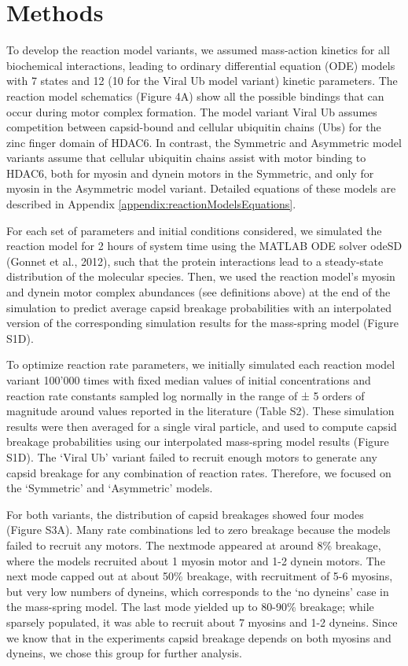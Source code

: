 \section{Methods}

To develop the reaction model variants, we assumed mass-action kinetics for all biochemical interactions, leading to ordinary differential equation (ODE) models with 7 states and 12 (10 for the Viral Ub model variant) kinetic parameters. The reaction model schematics (Figure 4A) show all the possible bindings that can occur during motor complex formation. The model variant Viral Ub assumes competition between capsid-bound and cellular ubiquitin chains (Ubs) for the zinc finger domain of HDAC6. In contrast, the Symmetric and Asymmetric model variants assume that cellular ubiquitin chains assist with motor binding to HDAC6, both for myosin and dynein motors in the Symmetric, and only for myosin in the Asymmetric model variant. Detailed equations of these models are described in Appendix \ref{appendix:reactionModelsEquations}.

For each set of parameters and initial conditions considered, we simulated the reaction model for 2 hours of system time using the MATLAB ODE solver odeSD (Gonnet et al., 2012), such that the protein interactions lead to a steady-state distribution of the molecular species. Then, we used the reaction model’s myosin and dynein motor complex abundances (see definitions above) at the end of the simulation to predict average capsid breakage probabilities with an interpolated version of the corresponding simulation results for the mass-spring model (Figure S1D).

To optimize reaction rate parameters, we initially simulated each reaction model variant 100’000 times with fixed median values of initial concentrations and reaction rate constants sampled log normally in the range of ± 5 orders of magnitude around values reported in the literature (Table S2). These simulation results were then averaged for a single viral particle, and used to compute capsid breakage probabilities using our interpolated mass-spring model results (Figure S1D). The ‘Viral Ub’ variant failed to recruit enough motors to generate any capsid breakage for any combination of reaction rates. Therefore, we focused on the ‘Symmetric’ and ‘Asymmetric’ models.

For both variants, the distribution of capsid breakages showed four modes (Figure S3A). Many rate combinations led to zero breakage because the models failed to recruit any motors. The nextmode appeared at around 8\% breakage, where the models recruited about 1 myosin motor and 1-2 dynein motors. The next mode capped out at about 50\% breakage, with recruitment of 5-6 myosins, but very low numbers of dyneins, which corresponds to the ‘no dyneins’ case in the mass-spring model. The last mode yielded up to 80-90\% breakage; while sparsely populated, it was able to recruit about 7 myosins and 1-2 dyneins. Since we know that in the experiments capsid breakage depends on both myosins and dyneins, we chose this group for further analysis.

